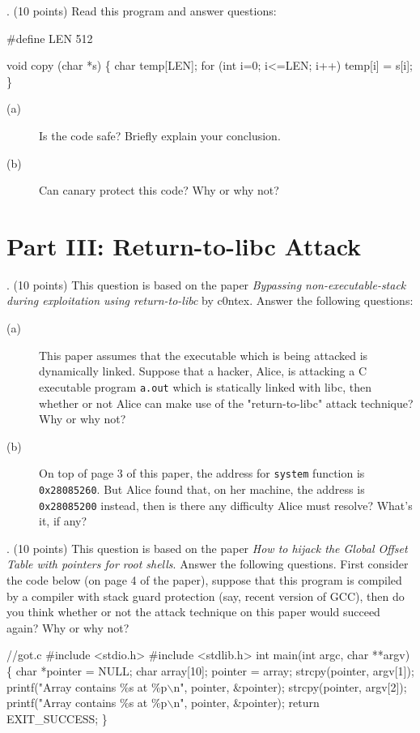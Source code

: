 \documentclass[a4paper, 10pt]{article}
\begin{document}
\newpage
{}. (10 points) Read this program and answer questions:
\begin{code}
\#define LEN 512

void copy (char *s)
\{
    char temp[LEN];
    for (int i=0; i<=LEN; i++)
        temp[i] = s[i];
\}
\end{code}
\begin{description}
  \item[(a)] Is the code safe? Briefly explain your conclusion.
  \item[(b)] Can canary protect this code? Why or why not?
\end{description}

\newpage
\section*{Part III: Return-to-libc Attack}
. (10 points) This question is based on the paper
\textit{Bypassing non-executable-stack during exploitation
using return-to-libc} by c0ntex. Answer the following questions:
\begin{description}
  \item[(a)] This paper assumes that the executable which
  is being attacked is dynamically linked. Suppose that a
  hacker, Alice, is attacking a C executable program {\tt a.out}
  which is statically linked with libc, then whether or not Alice
  can make use of the "return-to-libc" attack technique? Why or why not?
  \item[(b)] On top of page 3 of this paper, the address
  for \texttt{system} function is \texttt{0x28085260}. But
  Alice found that, on her machine, the address is \texttt{0x28085200}
  instead, then is there any difficulty Alice must resolve? What's it, if any?
\end{description}


\newpage
{}. (10 points) This question is based on the paper
\textit{How to hijack the Global Offset Table with pointers for root shells}.
Answer the following questions. First consider the code below (on page 4 of
the paper), suppose that this program is compiled by a compiler
with stack guard protection (say, recent version of GCC), then do you
think whether or not the attack technique on this paper would
succeed again? Why or why not?
\begin{code}
//got.c
\#include <stdio.h>
\#include <stdlib.h>
int main(int argc, char **argv)
\{
        char *pointer = NULL;
        char array[10];
        pointer = array;
        strcpy(pointer, argv[1]);
        printf("Array contains \%s at \%p$\backslash$n", pointer, \&pointer);
        strcpy(pointer, argv[2]);
        printf("Array contains \%s at \%p$\backslash$n", pointer, \&pointer);
        return EXIT\_SUCCESS;
\}
\end{code}
\end{document}
